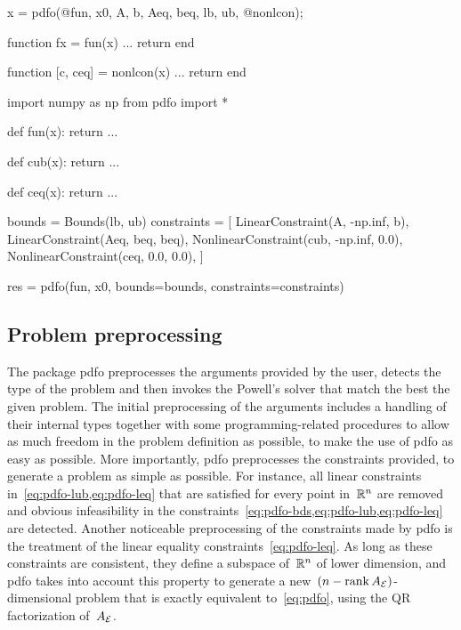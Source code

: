 \begin{lstmatlab}[%
    caption=An elementary example of \gls{pdfo} in MATLAB,
    label=lst:minimum-example-matlab,
]
    x = pdfo(@fun, x0, A, b, Aeq, beq, lb, ub, @nonlcon);

    function fx = fun(x)
    ...
    return
    end

    function [c, ceq] = nonlcon(x)
    ...
    return
    end
\end{lstmatlab}

\begin{lstpython}[%
    caption=An elementary example of \gls{pdfo} in Python,
    label=lst:minimum-example-python,
]
    import numpy as np
    from pdfo import *

    def fun(x):
        return ...
    
    def cub(x):
        return ...
    
    def ceq(x):
        return ...
    
    bounds = Bounds(lb, ub)
    constraints = [
        LinearConstraint(A, -np.inf, b),
        LinearConstraint(Aeq, beq, beq),
        NonlinearConstraint(cub, -np.inf, 0.0),
        NonlinearConstraint(ceq, 0.0, 0.0),
    ]

    res = pdfo(fun, x0, bounds=bounds, constraints=constraints)
\end{lstpython}

\subsection{Problem preprocessing}

The package \gls{pdfo} preprocesses the arguments provided by the user, detects the type of the problem and then invokes the Powell's solver that match the best the given problem.
The initial preprocessing of the arguments includes a handling of their internal types together with some programming-related procedures to allow as much freedom in the problem definition as possible, to make the use of \gls{pdfo} as easy as possible.
More importantly, \gls{pdfo} preprocesses the constraints provided, to generate a problem as simple as possible.
For instance, all linear constraints in~\cref{eq:pdfo-lub,eq:pdfo-leq} that are satisfied for every point in~$\mathbb{R}^n$ are removed and obvious infeasibility in the constraints~\cref{eq:pdfo-bds,eq:pdfo-lub,eq:pdfo-leq} are detected.
Another noticeable preprocessing of the constraints made by \gls{pdfo} is the treatment of the linear equality constraints~\cref{eq:pdfo-leq}.
As long as these constraints are consistent, they define a subspace of~$\mathbb{R}^n$ of lower dimension, and \gls{pdfo} takes into account this property to generate a new~$(n - \operatorname{rank} A_{\mathcal{E}})$-dimensional problem that is exactly equivalent to~\cref{eq:pdfo}, using the QR factorization of~$A_{\mathcal{E}}$.

